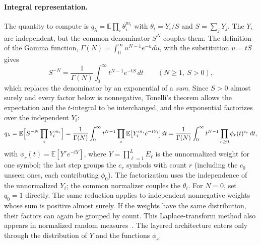 \documentclass[anon]{alt2027}
\newcommand{\E}{\mathbb{E}}
\begin{document}
\paragraph{Integral representation.} The quantity to compute is $q_\lambda=\E\prod_i\theta_i^{m_i}$ with $\theta_i=Y_i/S$ and $S=\sum_jY_j$. The $Y_i$ are independent, but the common denominator $S^{N}$ couples them. The definition of the Gamma function, $\Gamma(N)=\int_0^\infty u^{N-1}e^{-u}du$, with the substitution $u=tS$ gives
\begin{equation}
S^{-N}=\frac{1}{\Gamma(N)}\int_0^\infty t^{N-1}e^{-tS}\,dt\qquad(N\ge1,\ S>0),
\end{equation}
which replaces the denominator by an exponential of a \emph{sum}. Since $S>0$ almost surely and every factor below is nonnegative, Tonelli's theorem allows the expectation and the $t$-integral to be interchanged, and the exponential factorizes over the independent $Y_i$:
\begin{equation}
\label{eq:q-integral}
q_\lambda=\E\Bigl[S^{-N}\prod_iY_i^{m_i}\Bigr]=\frac1{\Gamma(N)}\int_0^\infty t^{N-1}\prod_i\E\bigl[Y_i^{m_i}e^{-tY_i}\bigr]dt=\frac1{\Gamma(N)}\int_0^\infty t^{N-1}\prod_{r\ge0}\phi_r(t)^{c_r}\,dt,
\end{equation}
with $\phi_r(t)=\E[Y^re^{-tY}]$, where $Y=\prod_{\ell=1}^LE_\ell$ is the unnormalized weight for one symbol; the last step groups the $c_r$ symbols with count $r$ (including the $c_0$ unseen ones, each contributing $\phi_0$). The factorization uses the independence of the unnormalized $Y_i$; the common normalizer couples the $\theta_i$. For $N=0$, set $q_0=1$ directly. The same reduction applies to independent nonnegative weights whose sum is positive almost surely. If the weights have the same distribution, their factors can again be grouped by count. This Laplace-transform method also appears in normalized random measures~\citep{james2009posterior}. The layered architecture enters only through the distribution of $Y$ and the functions $\phi_r$.
\end{document}
